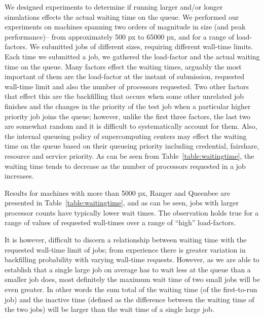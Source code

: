 \documentclass[conference,final]{IEEEtran}
\begin{document}
We designed experiments to determine if running larger and/or longer
simulations effects the actual waiting time on the queue. We performed
our experiments on machines spanning two orders of magnitude in size
(and peak performance)-- from approximately 500 px to 65000
px, and for a range of load-factors.  We submitted jobs of
different sizes, requiring different wall-time limits. Each time we
submitted a job, we gathered the load-factor and the actual waiting
time on the queue. Many factors effect the waiting times, arguably the
most important of them are the load-factor at the instant of
submission, requested wall-time limit and also the number of
processors requested. Two other factors that effect this are the
backfilling that occurs when some other unrelated job finishes and the
changes in the priority of the test job when a particular higher
priority job joins the queue; however, unlike the first three factors,
the last two are somewhat random and it is difficult to systematically
account for them. Also, the internal queueing policy of supercomputing
centers may effect the waiting time on the queue based on their
queueing priority including credential, fairshare, resource and
service priority.  As can be seen from Table~\ref{table:waitingtime},
the waiting time tends to decrease as the number of processors
requested in a job increases.



Results for machines with more than 5000 px, Ranger and
Queenbee are presented in Table~\ref{table:waitingtime}, and as can be
seen, jobs with larger processor counts have typically lower wait
times. The observation holds true for a range of values of requested
wall-times over a range of ``high'' load-factors.


It is however, difficult to discern a relationship between waiting
time with the requested wall-time limit of jobs; from experience there
is greater variation in backfilling probability with varying wall-time
requests.  However, as we are able to establish that a
single large job on average has to wait less at the queue than a
smaller job does, most definitely the maximum wait time of two
small jobs will be even greater. In other words the sum total of the
waiting time (of the first-to-run job) and the inactive time (defined
as the difference between the waiting time of the two jobs) will be
larger than the wait time of a single large job.
\end{document}

